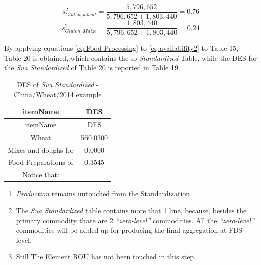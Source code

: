 \documentclass[]{article}
\providecommand{\tightlist}{%
  \setlength{\itemsep}{0pt}\setlength{\parskip}{0pt}}
\begin{document}
\begin{equation}
\label{eq:shareEx1}
s^{2}_{Gluten,wheat} = \frac{5,796,652}{5,796,652 + 1,803,440} = 0.76
\end{equation}\begin{equation}
\label{eq:shareEx1}
s^{2}_{Gluten,Maize} = \frac{1,803,440}{5,796,652 + 1,803,440} = 0.24
\end{equation}

By applying equations \ref{eq:Food Processing} to \ref{eq:availability2}
to Table 15, Table 20 is obtained, which contains the so
\emph{Standardized} Table, while the DES for the \emph{Sua Standardized}
of Table 20 is reported in Table 19.

\begin{longtable}[]{@{}cc@{}}
\caption{DES of \emph{Sua Standardized} - China/Wheat/2014
example}\tabularnewline
\toprule
itemName & DES\tabularnewline
\midrule
\endfirsthead
\toprule
itemName & DES\tabularnewline
\midrule
\endhead
Wheat & 560.0300\tabularnewline
Mixes and doughs for & 0.0000\tabularnewline
Food Preparations of & 0.3545\tabularnewline
Notice that: &\tabularnewline
\bottomrule
\end{longtable}

\begin{enumerate}
\def\labelenumi{\arabic{enumi}.}
\tightlist
\item
  \emph{Production} remains untouched from the Standardization
\item
  The \emph{Sua Standardized} table contains more that 1 line, because,
  besides the primary commodity thare are 2 \emph{``zero-level''}
  commodities. All the \emph{``zero-level''} commodities will be added
  up for producing the final aggregation at FBS level.
\item
  Still The Element ROU has not been touched in this step.
\end{enumerate}
\end{document}
